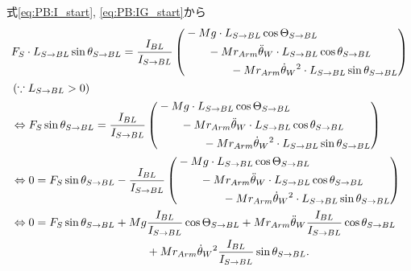 \documentclass[a4paper,11pt]{jsarticle}
\begin{document}
式\ref{eq:PB:I_start}, \ref{eq:PB:IG_start}から
\begin{align}
  & F_S \cdot L_{S\rightarrow BL} \sin\theta_{S\rightarrow BL}
  = \frac{I_{BL}}{I_{S\rightarrow BL}}
  \left(
    \begin{aligned}
      &-Mg \cdot L_{S\rightarrow BL}\cos\Theta_{S\rightarrow BL}
      \\
      & \qquad - Mr_{Arm}\ddot{\theta}_W \cdot L_{S\rightarrow BL} \cos\theta_{S\rightarrow BL}
      \\
      & \qquad \qquad - Mr_{Arm}\dot{\theta}_W{}^2 \cdot L_{S\rightarrow BL} \sin\theta_{S\rightarrow BL}
    \end{aligned}
  \right)
  \notag
  \\
  &
  \left( \because L_{S\rightarrow BL} > 0 \right) 
  \notag
  \\
  & \Leftrightarrow
  F_S\sin\theta_{S\rightarrow BL}
   = \frac{I_{BL}}{I_{S\rightarrow BL}}
   \left(
     \begin{aligned}
       &-Mg \cdot L_{S\rightarrow BL}\cos\Theta_{S\rightarrow BL}
       \\
       & \qquad - Mr_{Arm}\ddot{\theta}_W \cdot L_{S\rightarrow BL} \cos\theta_{S\rightarrow BL}
       \\
       & \qquad \qquad - Mr_{Arm}\dot{\theta}_W{}^2 \cdot L_{S\rightarrow BL} \sin\theta_{S\rightarrow BL}
     \end{aligned}
   \right)
  \notag
  \\
  & \Leftrightarrow
  0
   = F_S\sin\theta_{S\rightarrow BL} - \frac{I_{BL}}{I_{S\rightarrow BL}}
   \left(
     \begin{aligned}
       &-Mg \cdot L_{S\rightarrow BL}\cos\Theta_{S\rightarrow BL}
       \\
       & \qquad - Mr_{Arm}\ddot{\theta}_W \cdot L_{S\rightarrow BL} \cos\theta_{S\rightarrow BL}
       \\
       & \qquad \qquad - Mr_{Arm}\dot{\theta}_W{}^2 \cdot L_{S\rightarrow BL} \sin\theta_{S\rightarrow BL}
     \end{aligned}
   \right)
  \notag
  \\
  & \Leftrightarrow
  0
  = F_S\sin\theta_{S\rightarrow BL}
  +Mg \frac{I_{BL}}{I_{S\rightarrow BL}}\cos\Theta_{S\rightarrow BL}
  +Mr_{Arm}\ddot{\theta}_W \frac{I_{BL}}{I_{S\rightarrow BL}}\cos\theta_{S\rightarrow BL}
  \notag
  \\
  & \qquad \qquad \qquad \qquad \qquad \qquad + Mr_{Arm}\dot{\theta}_W{}^2 \frac{I_{BL}}{I_{S\rightarrow BL}}\sin\theta_{S\rightarrow BL}.
  \label{eq:PB:Fs_sin}
\end{align}
\end{document}
